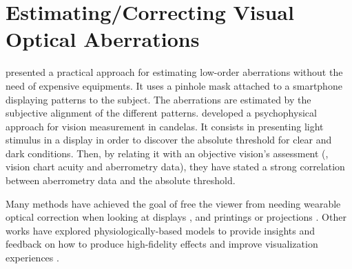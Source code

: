 
\section{Estimating/Correcting Visual Optical Aberrations}
\label{sec:EstimatingCorrectingVisualOpticalAberrations}

\citet{Pamplona2010} presented a practical approach for estimating low-order aberrations without the need of expensive equipments. It uses a pinhole mask attached to a smartphone displaying patterns to the subject. The aberrations are estimated by the subjective alignment of the different patterns.
\citet{Kronbauer2011} developed a psychophysical approach for vision measurement in candelas. It consists in presenting light stimulus in a display in order to discover the absolute threshold for clear and dark conditions. Then, by relating it with an objective vision's assessment (\eg, vision chart acuity and aberrometry data), they have stated a strong correlation between aberrometry data and the absolute threshold.

Many methods have achieved the goal of free the viewer from needing wearable optical correction when looking at displays \cite{Huang2012, Pamplona2012b, Huang2014}, and printings or projections \cite{Montalto2015}. Other works have explored physiologically-based models to provide insights and feedback on how to produce high-fidelity effects and improve visualization experiences \cite{Machado2009, Pamplona2009, Pamplona2011}.  

